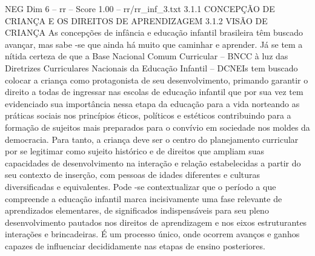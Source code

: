 \begin{textsample}{NEG Dim 6 – rr – Score 1.00 – rr/rr\_inf\_3.txt}  \label{ex:f6_neg_072}
3.1.1 CONCEPÇÃO DE CRIANÇA E OS DIREITOS DE APRENDIZAGEM 3.1.2 VISÃO DE CRIANÇA As concepções de infância e educação infantil brasileira têm buscado avançar, mas sabe -se que ainda há muito que caminhar e aprender.
Já se tem a nítida certeza de que a Base Nacional Comum Curricular – BNCC à luz das Diretrizes Curriculares Nacionais da Educação Infantil – DCNEIs tem buscado colocar a criança como protagonista de seu desenvolvimento, primando garantir o direito a todas de ingressar nas escolas de educação infantil que por sua vez tem evidenciado sua importância nessa etapa da educação para a vida norteando as práticas sociais nos princípios éticos, políticos e estéticos contribuindo para a formação de sujeitos mais preparados para o convívio em sociedade nos moldes da democracia.
Para tanto, a criança deve ser o centro do planejamento curricular por se legitimar como sujeito histórico e de direitos que ampliam suas capacidades de desenvolvimento na interação e relação estabelecidas a partir do seu contexto de inserção, com pessoas de idades diferentes e culturas diversificadas e equivalentes.
Pode -se contextualizar que o período a que compreende a educação infantil marca incisivamente uma fase relevante de aprendizados elementares, de significados indispensáveis para seu pleno desenvolvimento pautados nos direitos de aprendizagem e nos eixos estruturantes interações e brincadeiras.
É um processo único, onde ocorrem avanços e ganhos capazes de influenciar decididamente nas etapas de ensino posteriores.

\end{textsample}

